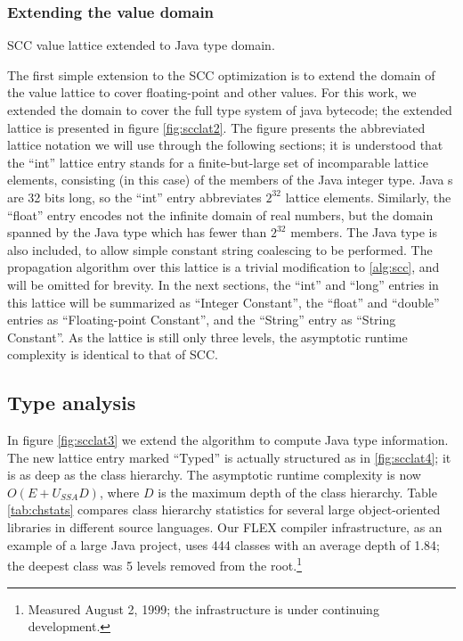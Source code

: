 \documentclass[12pt,titlepage,twoside]{article}
\newcommand*{\figscale}{1.0}
\begin{document}
\subsubsection{Extending the value domain}
\begin{myfigure}
\centering\renewcommand*{\figscale}{0.5}
\caption{SCC value lattice extended to Java type domain.}
\label{fig:scclat2}
\end{myfigure}
The first simple extension to the SCC optimization is to extend the
domain of the value lattice to cover floating-point and other values.
For this work, we extended the domain to cover the full type system of
java bytecode; the extended lattice is presented in figure \ref{fig:scclat2}.
The figure presents the abbreviated lattice notation we will use
through the following sections; it is understood that the ``int''
lattice entry stands for a finite-but-large set of
incomparable lattice elements, consisting (in this case) of the
members of the Java  integer type.
Java s are 32 bits long, so the ``int'' entry abbreviates
$2^{32}$ lattice elements.  Similarly, the ``float'' entry encodes not
the infinite domain of real numbers, but the domain spanned by the
Java  type which has fewer than $2^{32}$ members.  The
Java  type is also included, to allow simple constant
string coalescing to be performed.  The propagation algorithm over
this lattice is a trivial modification to \ref{alg:scc}, and will be
omitted for brevity.  In the next sections, the ``int'' and ``long''
entries in this lattice will be summarized as ``Integer Constant'',
the ``float'' and ``double'' entries as ``Floating-point Constant'',
and the ``String'' entry as ``String Constant''.  As the lattice is
still only three levels, the asymptotic runtime complexity is
identical to that of SCC.

\subsection{Type analysis}
In figure \ref{fig:scclat3} we extend the algorithm to compute Java
type information.  The new lattice entry marked ``Typed'' is actually
structured as in \ref{fig:scclat4}; it is as deep as the class
hierarchy.  The asymptotic runtime complexity is now $O(E+U_{SSA}D)$,
where $D$ is the maximum depth of the class hierarchy.  Table
\ref{tab:chstats}  compares class hierarchy statistics for several large
object-oriented libraries in different source languages. Our FLEX
compiler infrastructure, as an example of a large Java project, uses
444 classes with an average depth of 1.84; the deepest class was 5
levels removed from the root.\footnote{Measured August 2, 1999; the
infrastructure is under continuing development.}
\end{document}
